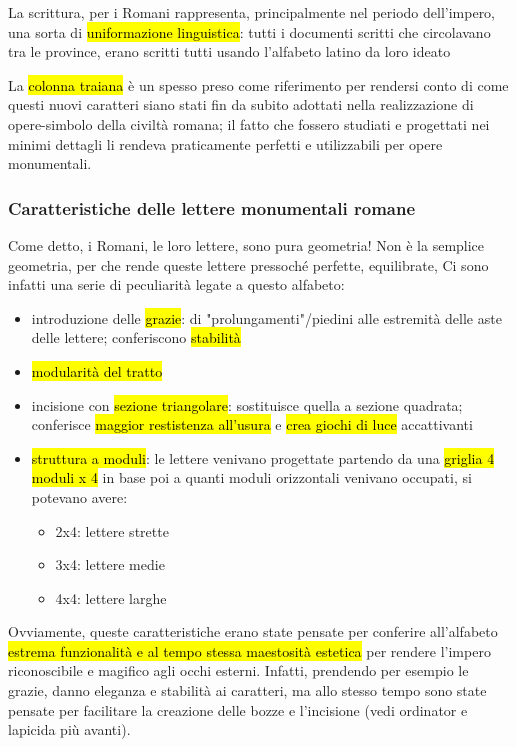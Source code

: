 \begin{mdframed}[style=mystyle,frametitle=Curiosità]
    La scrittura, per i Romani rappresenta, principalmente nel periodo dell'impero, una sorta di \hl{uniformazione linguistica}: tutti i documenti scritti che circolavano tra le province, erano scritti tutti usando l'alfabeto latino da loro ideato
    \end{mdframed}

La \hl{colonna traiana} è un spesso preso come riferimento per rendersi conto di come questi nuovi caratteri siano stati fin da subito adottati nella realizzazione di opere-simbolo della civiltà romana; il fatto che fossero studiati e progettati nei minimi dettagli li rendeva praticamente perfetti e utilizzabili per opere monumentali.
    \subsubsection{Caratteristiche delle lettere monumentali romane}
    Come detto, i Romani, le loro lettere, sono pura geometria! Non è la semplice geometria, per che rende queste lettere pressoché perfette, equilibrate, 
    Ci sono infatti una serie di peculiarità legate a questo alfabeto:
    \begin{itemize}
        \item introduzione delle \hl{grazie}: di "prolungamenti"/piedini alle estremità delle aste delle lettere; conferiscono \hl{stabilità}
        \item \hl{modularità del tratto}
        \item incisione con \hl{sezione triangolare}: sostituisce quella a sezione quadrata; conferisce \hl{maggior restistenza all'usura} e \hl{crea giochi di luce} accattivanti
        \item \hl{struttura a moduli}: le lettere venivano progettate partendo da una \hl{griglia 4 moduli x 4} in base poi a quanti moduli orizzontali venivano occupati, si potevano avere:
            \begin{itemize}
                \item 2x4: lettere strette
                \item 3x4: lettere medie
                \item 4x4: lettere larghe
            \end{itemize}
    \end{itemize}

    Ovviamente, queste caratteristiche erano state pensate per conferire all'alfabeto \hl{estrema funzionalità e al tempo stessa maestosità estetica} per rendere l'impero riconoscibile e magifico agli occhi esterni.
    Infatti, prendendo per esempio le grazie, danno eleganza e stabilità ai caratteri, ma allo stesso tempo sono state pensate per facilitare la creazione delle bozze e l'incisione (vedi ordinator e lapicida più avanti).

